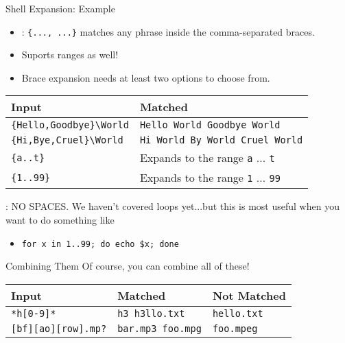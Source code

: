 \begin{frame}[fragile]{Shell Expansion: Example}
  \begin{itemize}
    \item {}: \texttt{\{..., ...\}} matches any phrase inside the comma-separated braces.
    \item Suports ranges as well!
    \item Brace expansion needs at least two options to choose from.
  \end{itemize}\vspace*{-2ex}
  \begin{center}
    {\small
    \begin{tabular}{|l|l|}
      \hline
      Input & Matched\\ \hline
      \texttt{\{Hello,Goodbye\}\textbackslash World} & \texttt{Hello World Goodbye World}\\ \hline
      \texttt{\{Hi,Bye,Cruel\}\textbackslash World} & \texttt{Hi World By World Cruel World}\\ \hline
      \texttt{\{a..t\}} & Expands to the range \texttt{a} ... \texttt{t}\\ \hline
      \texttt{\{1..99\}} & Expands to the range \texttt{1} ... \texttt{99}\\ \hline
    \end{tabular}
    }
  \end{center}
  : NO SPACES.
  We haven't covered loops yet...but this is most useful when you want to do something like
  \begin{itemize}
    \item \texttt{for x in {1..99}; do echo \$x; done}
  \end{itemize}
\end{frame}

\begin{frame}[fragile]{Combining Them}
  Of course, you can combine all of these!

  \begin{center}
    {\small
    \begin{tabular}{|l|l|l|}
      \hline
      Input & Matched & Not Matched\\ \hline
      \texttt{*h[0-9]*} & \texttt{h3 h3llo.txt} & \texttt{hello.txt}\\ \hline
      \texttt{[bf][ao][row].mp?} & \texttt{bar.mp3 foo.mpg} & \texttt{foo.mpeg}\\ \hline
    \end{tabular}
    }
  \end{center}
\end{frame}

